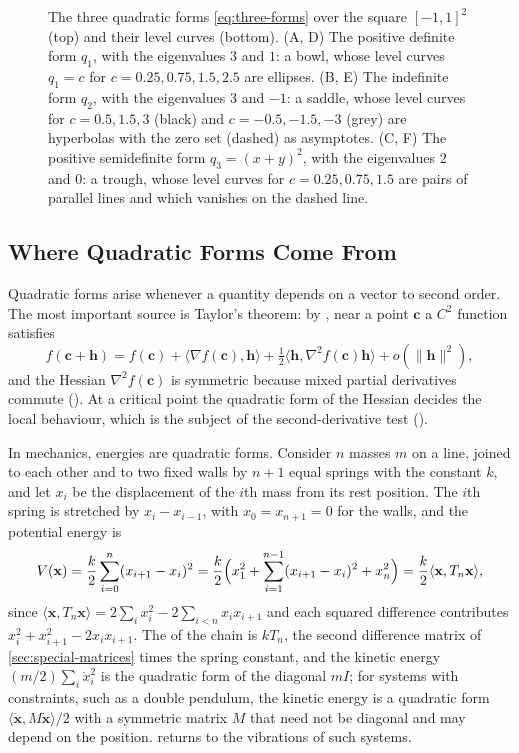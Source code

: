 \begin{figure}
\caption{The three quadratic forms \eqref{eq:three-forms} over the square $[-1,1]^2$ (top) and their level curves (bottom). (A, D) The positive definite form $q_1$, with the eigenvalues $3$ and $1$: a bowl, whose level curves $q_1=c$ for $c=0.25,0.75,1.5,2.5$ are ellipses. (B, E) The indefinite form $q_2$, with the eigenvalues $3$ and $-1$: a saddle, whose level curves for $c=0.5,1.5,3$ (black) and $c=-0.5,-1.5,-3$ (grey) are hyperbolas with the zero set (dashed) as asymptotes. (C, F) The positive semidefinite form $q_3=(x+y)^2$, with the eigenvalues $2$ and $0$: a trough, whose level curves for $c=0.25,0.75,1.5$ are pairs of parallel lines and which vanishes on the dashed line.\label{fig:quadratic-forms}}
\end{figure}

\subsection{Where Quadratic Forms Come From}

Quadratic forms arise whenever a quantity depends on a vector to second order. The most important source is Taylor's theorem: by , near a point $\mathbf c$ a $C^2$ function satisfies
\[
f(\mathbf c+\mathbf h)=f(\mathbf c)+\langle\nabla f(\mathbf c),\mathbf h\rangle+\tfrac12\langle\mathbf h,\nabla^2f(\mathbf c)\mathbf h\rangle+o(\|\mathbf h\|^2),
\]
and the Hessian $\nabla^2f(\mathbf c)$ is symmetric because mixed partial derivatives commute (). At a critical point the quadratic form of the Hessian decides the local behaviour, which is the subject of the second-derivative test ().

In mechanics, energies are quadratic forms. Consider $n$ masses $m$ on a line, joined to each other and to two fixed walls by $n+1$ equal springs with the constant $k$, and let $x_i$ be the displacement of the $i$th mass from its rest position. The $i$th spring is stretched by $x_{i}-x_{i-1}$, with $x_0=x_{n+1}=0$ for the walls, and the potential energy is
\[
V(\mathbf x)=\frac k2\sum_{i=0}^{n}(x_{i+1}-x_i)^2=\frac k2\Bigl(x_1^2+\sum_{i=1}^{n-1}(x_{i+1}-x_i)^2+x_n^2\Bigr)=\frac k2\langle\mathbf x,T_n\mathbf x\rangle ,
\]
since $\langle\mathbf x,T_n\mathbf x\rangle=2\sum_ix_i^2-2\sum_{i<n}x_ix_{i+1}$ and each squared difference contributes $x_i^2+x_{i+1}^2-2x_ix_{i+1}$. The  of the chain is $kT_n$, the second difference matrix of \cref{sec:special-matrices} times the spring constant, and the kinetic energy $(m/2)\sum_i\dot x_i^2$ is the quadratic form of the diagonal  $mI$; for systems with constraints, such as a double pendulum, the kinetic energy is a quadratic form $\langle\dot{\mathbf x},M\dot{\mathbf x}\rangle/2$ with a symmetric matrix $M$ that need not be diagonal and may depend on the position.  returns to the vibrations of such systems.

